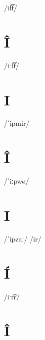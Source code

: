 \documentclass[10pt,a4paper,twoside]{book}
\begin{document}
\begin{multicols}{3}
 {/if͡f/} {}
\end{multicols}

\section*{Î}

\begin{multicols}{3}
 {/iːf͡f/} {}
\end{multicols}

\section*{I}

\begin{multicols}{3}
 {/ˈipmir/} {}
\end{multicols}

\section*{Î}

\begin{multicols}{3}
 {/ˈiːpwø/} {}
\end{multicols}

\section*{I}

\begin{multicols}{3}
 {/ˈipzaː/} {}
 {/ir/} {}
\end{multicols}

\section*{Í}

\begin{multicols}{3}
 {/iˑr͡r/} {}
\end{multicols}

\section*{Î}
\end{document}
